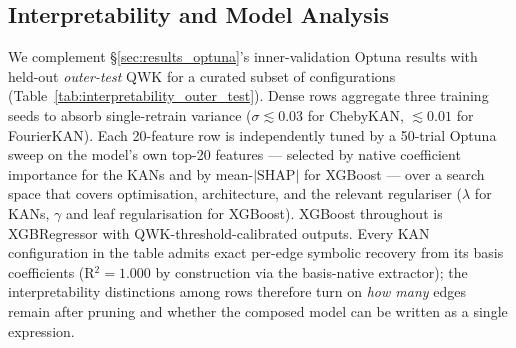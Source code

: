 %
%
\subsection{Interpretability and Model Analysis}
\label{sec:interpretability}

We complement \S\ref{sec:results_optuna}'s inner-validation Optuna
results with held-out \emph{outer-test} QWK for a curated subset of
configurations (Table~\ref{tab:interpretability_outer_test}). Dense
rows aggregate three training seeds to absorb single-retrain variance
($\sigma \lesssim 0.03$ for ChebyKAN, $\lesssim 0.01$ for FourierKAN).
Each 20-feature row is independently tuned by a 50-trial Optuna sweep
on the model's own top-20 features --- selected by native coefficient
importance for the KANs and by mean-$|\mathrm{SHAP}|$ for XGBoost ---
over a search space that covers optimisation, architecture, and the
relevant regulariser ($\lambda$ for KANs, $\gamma$ and leaf
regularisation for XGBoost). XGBoost throughout is XGBRegressor with
QWK-threshold-calibrated outputs. Every KAN configuration in the
table admits exact per-edge symbolic recovery from its basis
coefficients (R$^2 = 1.000$ by construction via the basis-native
extractor); the interpretability distinctions among rows therefore
turn on \emph{how many} edges remain after pruning and whether the
composed model can be written as a single expression.

